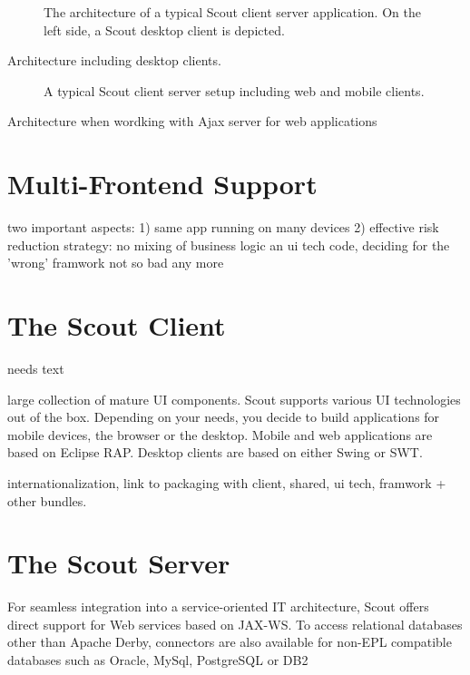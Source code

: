 \documentclass[a4paper,10pt,twoside]{book}
\begin{document}
\begin{figure}
\caption{The architecture of a typical Scout client server application.
On the left side, a Scout desktop client is depicted.}
\end{figure}

Architecture including desktop clients.

\begin{figure}
\caption{A typical Scout client server setup including web and mobile clients.}
\end{figure}

Architecture when wordking with Ajax server for web applications

\section{Multi-Frontend Support}

two important aspects: 1) same app running on many devices 2) effective risk reduction strategy: no mixing of business logic an ui tech code, deciding for the 'wrong' framwork not so bad any more

\section{The Scout Client}
needs text

 large collection of mature UI components.
 Scout supports various UI technologies out of the box. 
 Depending on your needs, you decide to build applications for
mobile devices, the browser or the desktop. Mobile and
web applications are based on Eclipse RAP. Desktop clients
are based on either Swing or SWT.

internationalization, link to packaging with client, shared, ui tech, framwork + other bundles. 

\section{The Scout Server}

For seamless integration into a service-oriented IT architecture, Scout offers direct support for Web services based on
JAX-WS. To access relational databases other than Apache
Derby, connectors are also available for non-EPL compatible databases such as Oracle, MySql, PostgreSQL or DB2
\end{document}
